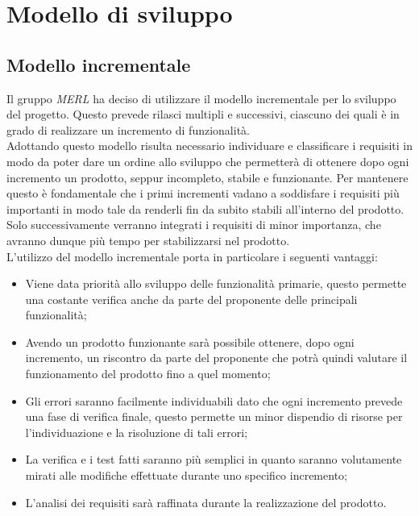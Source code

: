 \chapter{Modello di sviluppo}

\section{Modello incrementale}
Il gruppo \textit{MERL} ha deciso di utilizzare il modello incrementale per lo sviluppo del progetto. Questo prevede rilasci multipli e successivi, ciascuno dei quali è in grado di realizzare un incremento di funzionalità.
\\Adottando questo modello risulta necessario individuare e classificare i requisiti in modo da poter dare un ordine allo sviluppo che permetterà di ottenere dopo ogni incremento un prodotto, seppur incompleto, stabile e funzionante. Per mantenere questo è fondamentale che i primi incrementi vadano a soddisfare i requisiti più importanti in modo tale da renderli fin da subito stabili all'interno del prodotto. Solo successivamente verranno integrati i requisiti di minor importanza, che avranno dunque più tempo per stabilizzarsi nel prodotto.
\\L'utilizzo del modello incrementale porta in particolare i seguenti vantaggi:
\begin{itemize}
  \item Viene data priorità allo sviluppo delle funzionalità primarie, questo permette una costante verifica anche da parte del proponente delle principali funzionalità;
  \item Avendo un prodotto funzionante sarà possibile ottenere, dopo ogni incremento, un riscontro da parte del proponente che potrà quindi valutare il funzionamento del prodotto fino a quel momento;
  \item Gli errori saranno facilmente individuabili dato che ogni incremento prevede una fase di verifica finale, questo permette un minor dispendio di risorse per l'individuazione e la risoluzione di tali errori;
  \item La verifica e i test fatti saranno più semplici in quanto saranno volutamente mirati alle modifiche effettuate durante uno specifico incremento;
  \item L'analisi dei requisiti sarà raffinata durante la realizzazione del prodotto.
\end{itemize}
